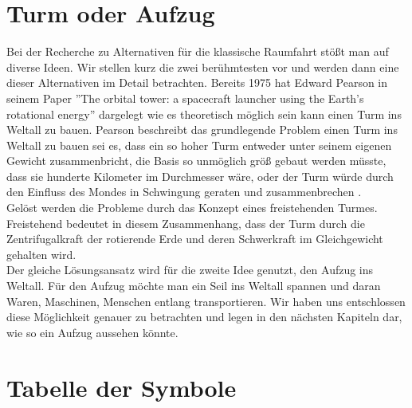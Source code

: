 \documentclass[a4paper, 10pt]{report}
\begin{document}
\section{Turm oder Aufzug}
Bei der Recherche zu Alternativen für die klassische Raumfahrt stößt man auf diverse Ideen. Wir stellen kurz die zwei berühmtesten vor und werden dann eine dieser Alternativen im Detail betrachten.
Bereits 1975 hat Edward Pearson in seinem Paper ''The orbital tower: a spacecraft launcher using the Earth's rotational energy'' dargelegt wie es theoretisch möglich sein kann einen Turm ins Weltall zu bauen. Pearson beschreibt das grundlegende Problem einen Turm ins Weltall zu bauen sei es, dass ein so hoher Turm entweder unter seinem eigenen Gewicht zusammenbricht, die Basis so unmöglich größ gebaut werden müsste, dass sie hunderte Kilometer im Durchmesser wäre, oder der Turm würde durch den Einfluss des Mondes in Schwingung geraten und zusammenbrechen \cite[vgl. Introduction]{PE75}.\\
Gelöst werden die Probleme durch das Konzept eines freistehenden Turmes. Freistehend bedeutet in diesem Zusammenhang, dass der Turm durch die Zentrifugalkraft der rotierende Erde und deren Schwerkraft im Gleichgewicht gehalten wird.\\
Der gleiche Lösungsansatz wird für die zweite Idee genutzt, den Aufzug ins Weltall. Für den Aufzug möchte man ein Seil ins Weltall spannen und daran Waren, Maschinen, Menschen entlang transportieren. 
Wir haben uns entschlossen diese Möglichkeit genauer zu betrachten und legen in den nächsten Kapiteln dar, wie so ein Aufzug aussehen könnte.
\section{Tabelle der Symbole}
\end{document}
